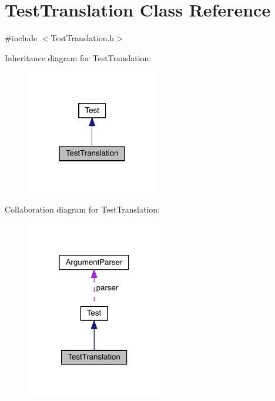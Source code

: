 \hypertarget{class_test_translation}{}\section{Test\+Translation Class Reference}
\label{class_test_translation}


{\ttfamily \#include $<$Test\+Translation.\+h$>$}



Inheritance diagram for Test\+Translation\+:\nopagebreak
\begin{figure}[H]
\begin{center}
\leavevmode
\includegraphics[width=163pt]{d0/d9d/class_test_translation__inherit__graph}
\end{center}
\end{figure}


Collaboration diagram for Test\+Translation\+:\nopagebreak
\begin{figure}[H]
\begin{center}
\leavevmode
\includegraphics[width=169pt]{d3/d33/class_test_translation__coll__graph}
\end{center}
\end{figure}
